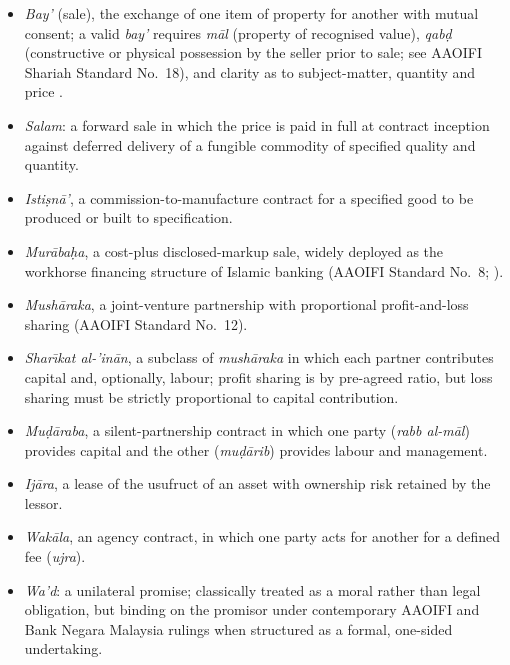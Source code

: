 \documentclass[preprint,12pt,authoryear]{elsarticle}
\theoremstyle{definition}
\begin{document}
\begin{itemize}
    \item \emph{Bay'} (sale), the exchange of one item of property
    for another with mutual consent; a valid \emph{bay'} requires
    \emph{m\={a}l} (property of recognised value), \emph{qab\d{d}}
    (constructive or physical possession by the seller prior to sale;
    see AAOIFI Shariah Standard No.~18), and clarity as to
    subject-matter, quantity and price \citep{AAOIFI2015}.
    \item \emph{Salam}: a forward sale in which the price is paid in
    full at contract inception against deferred delivery of a fungible
    commodity of specified quality and quantity.
    \item \emph{Isti\d{s}n\={a}'}, a commission-to-manufacture
    contract for a specified good to be produced or built to
    specification.
    \item \emph{Mur\={a}ba\d{h}a}, a cost-plus disclosed-markup
    sale, widely deployed as the workhorse financing structure of
    Islamic banking (AAOIFI Standard No.~8; \citealp{Usmani2002}).
    \item \emph{Mush\={a}raka}, a joint-venture partnership with
    proportional profit-and-loss sharing (AAOIFI Standard No.~12).
    \item \emph{Shar\={\i}kat al-'in\={a}n}, a subclass of
    \emph{mush\={a}raka} in which each partner contributes capital and,
    optionally, labour; profit sharing is by pre-agreed ratio, but loss
    sharing must be strictly proportional to capital contribution.
    \item \emph{Mu\d{d}\={a}raba}, a silent-partnership contract in
    which one party (\emph{rabb al-m\={a}l}) provides capital and the
    other (\emph{mu\d{d}\={a}rib}) provides labour and management.
    \item \emph{Ij\={a}ra}, a lease of the usufruct of an asset with
    ownership risk retained by the lessor.
    \item \emph{Wak\={a}la}, an agency contract, in which one party
    acts for another for a defined fee (\emph{ujra}).
    \item \emph{Wa'd}: a unilateral promise; classically treated as
    a moral rather than legal obligation, but binding on the promisor
    under contemporary AAOIFI and Bank Negara Malaysia rulings when
    structured as a formal, one-sided undertaking.
\end{itemize}
\end{document}
